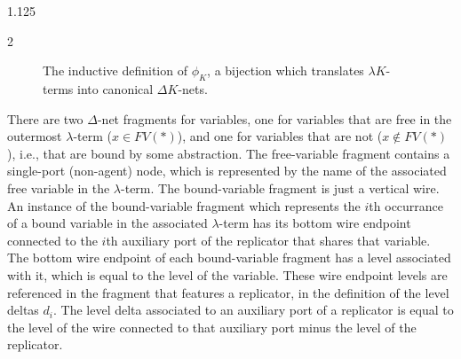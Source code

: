 \documentclass[10pt]{article}
\begin{document}
\begin{spacing}{1.125}
\begin{multicols}{2}
\begin{figure}[H]

  \caption{The inductive definition of $\phi_K$, a bijection which translates \mbox{$\lambda K$-terms} into canonical \mbox{$\Delta K$-nets}.}
  \label{fig:ltrules}
\end{figure}

There are two \mbox{$\Delta$-net} fragments for variables, one for variables that are free in the outermost \mbox{$\lambda$-term} (\mbox{$x \in FV(*)$}), and one for variables that are not (\mbox{$x \not\in FV(*)$}), i.e., that are bound by some abstraction.
The free-variable fragment contains a single-port (non-agent) node, which is represented by the name of the associated free variable in the \mbox{$\lambda$-term}.
The bound-variable fragment is just a vertical wire.
An instance of the bound-variable fragment which represents the $i$th occurrance of a bound variable in the associated \mbox{$\lambda$-term} has its bottom wire endpoint connected to the $i$th auxiliary port of the replicator that shares that variable.
The bottom wire endpoint of each bound-variable fragment has a level associated with it, which is equal to the level of the variable.
These wire endpoint levels are referenced in the fragment that features a replicator, in the definition of the level deltas $d_i$. The level delta associated to an auxiliary port of a replicator is equal to the level of the wire connected to that auxiliary port minus the level of the replicator.


\end{multicols}
\end{spacing}
\end{document}
